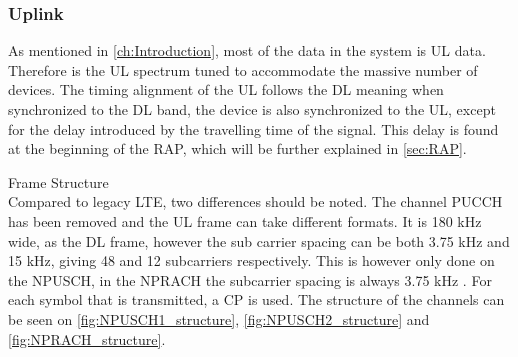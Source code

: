 \subsubsection{Uplink}
As mentioned in \autoref{ch:Introduction}, most of the data in the system is \gls{UL} data. Therefore is the \gls{UL} spectrum tuned to accommodate the massive number of devices. The timing alignment of the \gls{UL} follows the \gls{DL} meaning when synchronized to the \gls{DL} band, the device is also synchronized to the \gls{UL}, except for the delay introduced by the travelling time of the signal. This delay is found at the beginning of the \gls{RAP}, which will be further explained in \autoref{sec:RAP}. 

Frame Structure\\
Compared to legacy \gls{LTE}, two differences should be noted. The channel \gls{PUCCH} has been removed and the \gls{UL} frame can take different formats. It is 180 kHz wide, as the \gls{DL} frame, however the sub carrier spacing can be both 3.75 kHz and 15 kHz, giving 48 and 12 subcarriers respectively. This is however only done on the \gls{NPUSCH}, in the \gls{NPRACH} the subcarrier spacing is always 3.75 kHz \citep{NB-IoT_Book}. For each symbol that is transmitted, a \gls{CP} is used. The structure of the channels can be seen on \autoref{fig:NPUSCH1_structure}, \autoref{fig:NPUSCH2_structure} and \autoref{fig:NPRACH_structure}.

